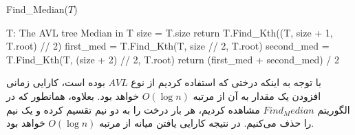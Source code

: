 \documentclass[]{article}
\begin{document}
\begin{latin}
    \begin{algorithm}[H]
        \caption*{Find\_Median($T$)}
        \begin{algorithmic}
            \Require T: The AVL tree
            \Ensure Median in T
            \State size = T.size
                \State return T.Find\_Kth((T, size + 1, T.root) // 2)
            \EndIf
            \State first\_med = T.Find\_Kth(T, size // 2, T.root)
            \State second\_med = T.Find\_Kth(T, (size + 2) // 2, T.root) 
            \State return (first\_med + second\_med) / 2 
        \end{algorithmic}
    \end{algorithm}
\end{latin}

با توجه به اینکه درختی که استفاده کردیم از نوع
$AVL$
بوده است، کارایی زمانی افزودن یک مقدار به آن از مرتبه
$O(\log n)$
خواهد بود.
بعلاوه، همانطور که در الگوریتم
$Find_Median$
مشاهده کردیم، هر بار درخت را به دو نیم تقسیم کرده و یک نیم را حذف می‌کنیم.
در نتیجه کارایی یافتن میانه از مرتبه
$O(\log n)$
خواهد بود.
\end{document}

